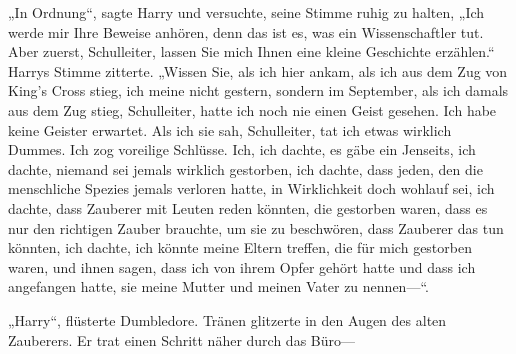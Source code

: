 „In Ordnung“, sagte Harry und versuchte, seine Stimme ruhig zu halten, „Ich werde mir Ihre Beweise anhören, denn das ist es, was ein Wissenschaftler tut. Aber zuerst, Schulleiter, lassen Sie mich Ihnen eine kleine Geschichte erzählen.“ Harrys Stimme zitterte. „Wissen Sie, als ich hier ankam, als ich aus dem Zug von King’s Cross stieg, ich meine nicht gestern, sondern im September, als ich damals aus dem Zug stieg, Schulleiter, hatte ich noch nie einen Geist gesehen. Ich habe keine Geister erwartet. Als ich sie sah, Schulleiter, tat ich etwas wirklich Dummes. Ich zog voreilige Schlüsse. Ich, ich dachte, es gäbe ein Jenseits, ich dachte, niemand sei jemals wirklich gestorben, ich dachte, dass jeden, den die menschliche Spezies jemals verloren hatte, in Wirklichkeit doch wohlauf sei, ich dachte, dass Zauberer mit Leuten reden könnten, die gestorben waren, dass es nur den richtigen Zauber brauchte, um sie zu beschwören, dass Zauberer das tun könnten, ich dachte, ich könnte meine Eltern treffen, die für mich gestorben waren, und ihnen sagen, dass ich von ihrem Opfer gehört hatte und dass ich angefangen hatte, sie meine Mutter und meinen Vater zu nennen—“.

„Harry“, flüsterte Dumbledore. Tränen glitzerte in den Augen des alten Zauberers. Er trat einen Schritt näher durch das Büro—

